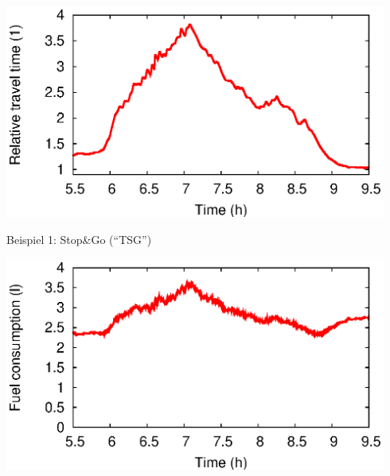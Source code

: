\documentclass[a4paper]{foils}
\begin{document}
\hspace{0.11\textwidth}
\includegraphics[width=0.94\textwidth]
 {figsAllg/F_0504_1.ASM.tseries.tt_delay.engl.eps}   

\newpage
\centerline{Beispiel 1: Stop\&Go (``TSG'')}

\hspace{0.11\textwidth}
\includegraphics[width=0.94\textwidth]
 {figsAllg/F_0504_1.ASM.tseries.fuel.engl.eps}   
\end{document}
